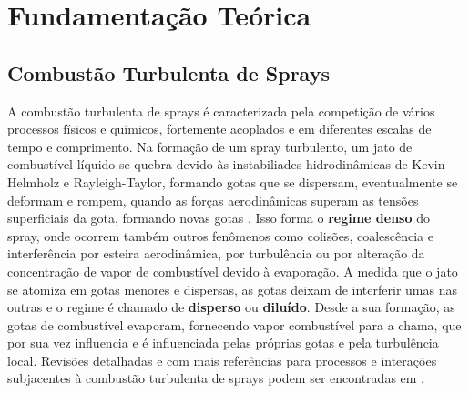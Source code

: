 

\section{Fundamentação Teórica}



\subsection{Combustão Turbulenta de Sprays} \label{sec:teoria}

A combustão turbulenta de sprays é caracterizada pela competição de vários processos físicos e químicos, fortemente acoplados e em diferentes escalas de tempo e comprimento. 
Na formação de um spray turbulento, um jato de combustível líquido se quebra devido às instabiliades hidrodinâmicas de Kevin-Helmholz e Rayleigh-Taylor, formando gotas que se dispersam, eventualmente se deformam e rompem, quando as forças aerodinâmicas superam as tensões superficiais da gota, formando novas gotas \cite{JennyB2012}.
Isso forma o \textbf{regime denso} do spray, onde ocorrem também outros fenômenos como colisões, coalescência e interferência por esteira aerodinâmica, por turbulência ou por alteração da concentração de vapor de combustível devido à evaporação.
A medida que o jato se atomiza em gotas menores e dispersas, as gotas deixam de interferir umas nas outras e o regime é chamado de \textbf{disperso} ou \textbf{diluído}. 
Desde a sua formação, as gotas de combustível evaporam, fornecendo vapor combustível para a chama, que por sua vez influencia e é influenciada pelas próprias gotas e pela turbulência local.
Revisões detalhadas e com mais referências para processos e interações subjacentes à combustão turbulenta de sprays podem ser encontradas em \cite{JennyB2012, MasriA2016, SanchezA2015, ZhouL2021,JiangX2010}.

